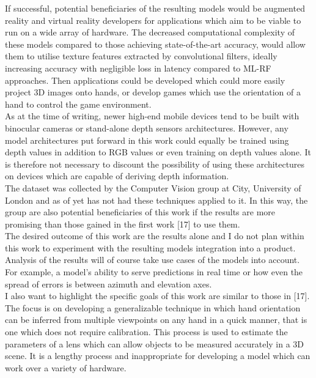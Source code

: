 \documentclass{article}
\begin{document}
If successful, potential beneficiaries of the resulting models would be augmented reality and virtual reality developers for applications which aim to be viable to run on a wide array of hardware. The decreased computational complexity of these models compared to those achieving state-of-the-art accuracy, would allow them to utilise texture features extracted by convolutional filters, ideally increasing accuracy with negligible loss in latency compared to ML-RF approaches. Then applications could be developed which could more easily project 3D images onto hands, or develop games which use the orientation of a hand to control the game environment.\\

As at the time of writing, newer high-end mobile devices tend to be built with binocular cameras or stand-alone depth sensors architectures. However, any model architectures put forward in this work could equally be trained using depth values in addition to RGB values or even training on depth values alone. It is therefore not necessary to discount the possibility of using these architectures on devices which are capable of deriving depth information. \\

The dataset was collected by the Computer Vision group at City, University of London and as of yet has not had these techniques applied to it. In this way, the group are also potential beneficiaries of this work if the results are more promising than those gained in the first work [17] to use them.\\

The desired outcome of this work are the results alone and I do not plan within this work to experiment with the resulting models integration into a product. Analysis of the results will of course take use cases of the models into account. For example, a model's ability to serve predictions in real time or how even the spread of errors is between azimuth and elevation axes.  \\

I also want to highlight the specific goals of this work are similar to those in [17]. The focus is on developing a generalizable technique in which hand orientation can be inferred from multiple viewpoints on any hand in a quick manner, that is one which does not require calibration. This process is used to estimate the parameters of a lens which can allow objects to be measured accurately in a 3D scene. It is a lengthy process and inappropriate for developing a model which can work over a variety of hardware.\\
\end{document}
